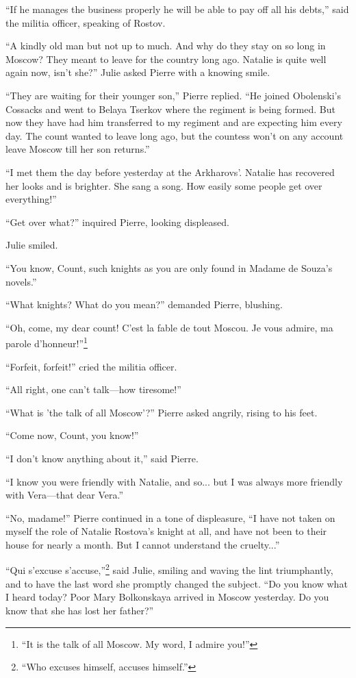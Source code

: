 ``If he manages the business properly he will be able to pay off
all his debts,'' said the militia officer, speaking of Rostov.

``A kindly old man but not up to much. And why do they stay on so
long in Moscow? They meant to leave for the country long
ago. Natalie is quite well again now, isn't she?'' Julie asked
Pierre with a knowing smile.

``They are waiting for their younger son,'' Pierre replied. ``He
joined Obolenski's Cossacks and went to Belaya Tserkov where the
regiment is being formed. But now they have had him transferred
to my regiment and are expecting him every day. The count wanted
to leave long ago, but the countess won't on any account leave
Moscow till her son returns.''

``I met them the day before yesterday at the Arkharovs'. Natalie
has recovered her looks and is brighter. She sang a song. How
easily some people get over everything!''

``Get over what?'' inquired Pierre, looking displeased.

Julie smiled.

``You know, Count, such knights as you are only found in Madame
de Souza's novels.''

``What knights? What do you mean?'' demanded Pierre, blushing.

``Oh, come, my dear count! C'est la fable de tout Moscou. Je vous
admire, ma parole d'honneur!''\footnote{``It is the talk of all
Moscow. My word, I admire you!''}

``Forfeit, forfeit!'' cried the militia officer.

``All right, one can't talk---how tiresome!''

``What is 'the talk of all Moscow'?'' Pierre asked angrily,
rising to his feet.

``Come now, Count, you know!''

``I don't know anything about it,'' said Pierre.

``I know you were friendly with Natalie, and so... but I was
always more friendly with Vera---that dear Vera.''

``No, madame!'' Pierre continued in a tone of displeasure, ``I
have not taken on myself the role of Natalie Rostova's knight at
all, and have not been to their house for nearly a month. But I
cannot understand the cruelty...''

``Qui s'excuse s'accuse,''\footnote{``Who excuses himself,
accuses himself.''} said Julie, smiling and waving the lint
triumphantly, and to have the last word she promptly changed the
subject. ``Do you know what I heard today? Poor Mary Bolkonskaya
arrived in Moscow yesterday. Do you know that she has lost her
father?''

